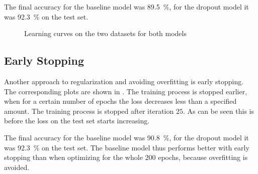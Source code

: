 \documentclass[12pt,a4paper]{scrartcl}
\begin{document}
	The final accuracy for the baseline model was \SI{89.5}{\percent}, for the dropout model it was \SI{92.3}{\percent} on the test set.

	\begin{figure}[H]
	\centering	
	\caption{Learning curves on the two datasets for both models}
	\label{fig:ex3_3_learning_curves}
	\end{figure}

	\subsection*{Early Stopping}
	
	Another approach to regularization and avoiding overfitting is early stopping. The corresponding plots are shown in . The training process is stopped earlier, when for a certain number of epochs the loss decreases less than a specified amount.
	The training process is stopped after iteration $25$. As can be seen this is before the loss on the test set starts increasing.
	
		The final accuracy for the baseline model was \SI{90.8}{\percent}, for the dropout model it was \SI{92.3}{\percent} on the test set. The baseline model thus performs better with early stopping than when optimizing for the whole $200$ epochs, because overfitting is avoided.
	
\end{document}
